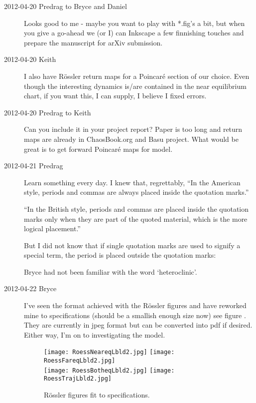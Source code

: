 \begin{description}
\item[2012-04-20 Predrag to Bryce and Daniel] Looks good to me - maybe
you want to play with *.fig's a bit, but when you give a go-ahead we (or
I) can Inkscape a few finnishing touches and prepare the manuscript for
arXiv submission.

\item[2012-04-20 Keith] I also have R\"ossler return maps for a
Poincar\'e section of our choice.  Even though the interesting dynamics
is/are contained in the near equilibrium chart, if you want this, I can
supply, I believe I fixed errors.

\item[2012-04-20 Predrag to Keith] Can you include it in your project report?
Paper is too long and return maps are already in ChaosBook.org and Basu project.
What would be great is to get forward Poincar\'e maps for {\twoMode} model.

\item[2012-04-21 Predrag] Learn something every day. I knew that,
regrettably, ``In the American style, periods and commas are always
placed inside the quotation marks.''

``In the British style, periods and commas are placed
inside the quotation marks only when they are part of the quoted
material, which is the more logical placement.''

But I did not know that if single quotation marks are used to signify a
special term, the period is placed outside the quotation marks:

    Bryce had not been familiar with the word `heteroclinic'.

\item[2012-04-22 Bryce] I've seen the format achieved with the R\"ossler
figures and have reworked mine to specifications (should be a smallish
enough size now) see figure . They are currently in
jpeg format but can be converted into pdf if desired. Either way, I'm on
to investigating the {\twoMode} model.

\begin{figure}
\centering
\texttt{[image: RoessNeareqLbld2.jpg]}
\texttt{[image: RoessFareqLbld2.jpg]} \\
\texttt{[image: RoessBotheqLbld2.jpg]}
\texttt{[image: RoessTrajLbld2.jpg]}
\caption{R\"ossler figures fit to specifications. \label{fig:newRoss}}
\end{figure}


\end{description}
